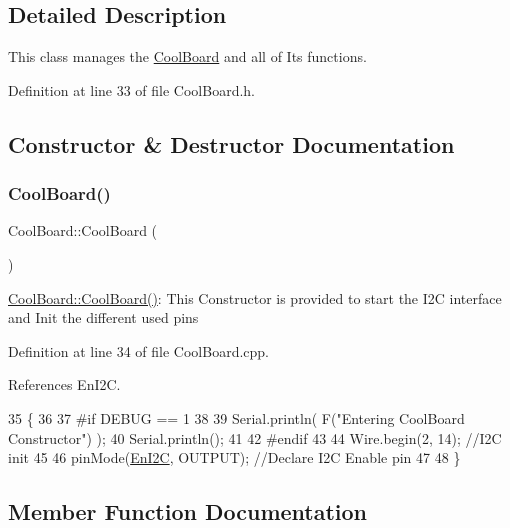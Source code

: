 \subsection{Detailed Description}
This class manages the \hyperlink{classCoolBoard}{Cool\+Board} and all of Its functions. 

Definition at line 33 of file Cool\+Board.\+h.



\subsection{Constructor \& Destructor Documentation}
\mbox{\label{classCoolBoard_a8b88fd781e22e93025dd63474113b7e4}} 
\subsubsection{\texorpdfstring{Cool\+Board()}{CoolBoard()}}
{\footnotesize\ttfamily Cool\+Board\+::\+Cool\+Board (\begin{DoxyParamCaption}{ }\end{DoxyParamCaption})}

\hyperlink{classCoolBoard_a8b88fd781e22e93025dd63474113b7e4}{Cool\+Board\+::\+Cool\+Board()}\+: This Constructor is provided to start the I2C interface and Init the different used pins 

Definition at line 34 of file Cool\+Board.\+cpp.



References En\+I2C.


\begin{DoxyCode}
35 \{
36 
37 \textcolor{preprocessor}{#if DEBUG == 1}
38 
39     Serial.println( F(\textcolor{stringliteral}{"Entering CoolBoard Constructor"}) );
40     Serial.println();
41 
42 \textcolor{preprocessor}{#endif}
43     
44     Wire.begin(2, 14);                       \textcolor{comment}{//I2C init }
45 
46     pinMode(\hyperlink{classCoolBoard_af1fe1376fc66f93dee80b327ca695377}{EnI2C}, OUTPUT);           \textcolor{comment}{//Declare I2C Enable pin }
47 
48 \}
\end{DoxyCode}


\subsection{Member Function Documentation}
\mbox{\label{classCoolBoard_acba7c5aef7268b2c0044bdb54d3b9d76}} 
